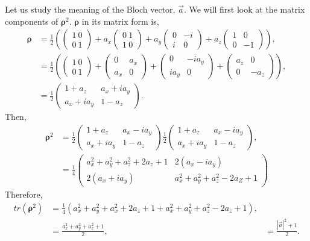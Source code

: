 \documentclass{article}
\begin{document}
Let us study the meaning of the Bloch vector, $\vec{a}$. We will first look at the matrix components
of $\boldsymbol{\rho}^2$. $\boldsymbol{\rho}$ in its matrix form is,
\begin{align*}\label{eq 6.50}
    \boldsymbol{\rho}&=\frac{1}{2}\left(\begin{pmatrix}
        1\ 0\\ 0\ 1
    \end{pmatrix}+a_x\begin{pmatrix}
        0\ 1\\ 1\ 0
    \end{pmatrix}
    +a_y\begin{pmatrix}
        0&-i\\i&0
    \end{pmatrix}
    +a_z\begin{pmatrix}
        1&0\\0&-1
    \end{pmatrix}\right),\\
    &=\frac{1}{2}\left(\begin{pmatrix}
        1\ 0\\ 0\ 1
    \end{pmatrix}+\begin{pmatrix}
        0&a_x\\a_x&0
    \end{pmatrix}+
    \begin{pmatrix}
        0& -ia_y\\ia_y&0
    \end{pmatrix}+
    \begin{pmatrix}
        a_z&0\\0&-a_z
    \end{pmatrix}\right),\\
    &=\frac{1}{2}\begin{pmatrix}
        1+a_z&a_x+ia_y\\
        a_x+ia_y&1-a_z
    \end{pmatrix}.\tag{6.50}
\end{align*}
Then,
\begin{align*} \label{eq 6.51}
    \boldsymbol{\rho}^2&=\frac{1}{2}\begin{pmatrix}
        1+a_z & a_x-ia_y\\a_x+ia_y&1-a_z
    \end{pmatrix}
    \frac{1}{2}\begin{pmatrix}
        1+a_z&a_x-ia_y\\
        a_x+ia_y&1-a_z
    \end{pmatrix},\\
    &=\frac{1}{4}\begin{pmatrix}
        a_x^2+a_y^2+a_z^2+2a_z+1&2(a_x-ia_y)\\
        2(a_x+ia_y)&a_x^2+a_y^2+a_z^2-2a_Z+1
    \end{pmatrix} \tag{6.51}
\end{align*}
Therefore,
\begin{align*}\label{eq 6.52}
    tr(\boldsymbol{\rho}^2)&=\frac{1}{4}(a_x^2+a_y^2+a_x^2+2a_z+1+a_x^2+a_y^2+a_z^2-2a_z+1),\\
    &=\frac{a_x^2+a_y^2+a_z^2+1}{2},
    &=\frac{|\vec{a}|^2+1}{2}.\tag{6.52}
\end{align*}
\end{document}
